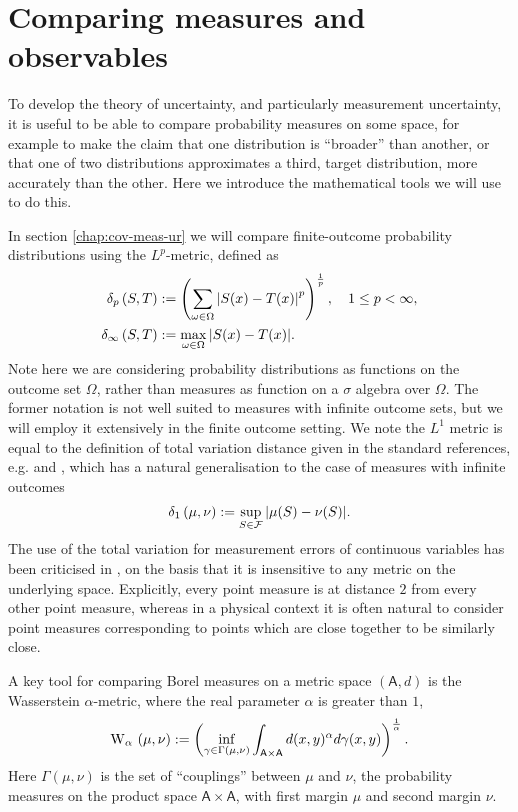 \section{Comparing measures and observables}
\label{sec:comp-measures-and-dists}
To develop the theory of uncertainty, and particularly measurement uncertainty, it is useful to be able to compare probability measures on some space, for example to make the claim that one distribution is ``broader'' than another, or that one of two distributions approximates a third, target distribution, more accurately than the other. Here we introduce the mathematical tools we will use to do this.

In section \ref{chap:cov-meas-ur} we will compare finite-outcome probability distributions using the $L^p$-metric, defined as
\begin{align}
  \label{eqn:lpvar-defn}
  \lPVar{S}{T}[p]&\defeq \left(\sum_{\omega\in\Omega} \abs{S(x) - T(x)}^p\right)^\frac{1}{p}, \quad 1\leq p < \infty,\\
  \lPVar{S}{T}[\infty] &\defeq \max_{\omega\in\Omega} \abs{S(x) - T(x)}.
\end{align}
Note here we are considering probability distributions as functions on the outcome set $\Omega$, rather than measures as function on a $\sigma$ algebra over $\Omega$. The former notation is not well suited to measures with infinite outcome sets, but we will employ it extensively in the finite outcome setting. We note the $L^1$ metric is equal to the definition of total variation distance given in the standard references, e.g. \cite{optimal-transport-villani} and \cite{topics-optimal-transport}, which has a natural generalisation to the case of measures with infinite outcomes
\begin{align}
  \lPVar{\mu}{\nu}[1] \defeq \sup_{S\in\fcal}\abs{\mu(S) - \nu(S)}.
\end{align}
The use of the total variation for measurement errors of continuous variables has been criticised in \cite{blw-meas-uncertainty}, on the basis that it is insensitive to any metric on the underlying space. Explicitly, every point measure is at distance $2$ from every other point measure, whereas in a physical context it is often natural to consider point measures corresponding to points which are close together to be similarly close.

A key tool for comparing Borel measures on a metric space $(\mathsf{A}, d)$ is the Wasserstein $\alpha$-metric, where the real parameter $\alpha$ is greater than $1$,
\begin{align}
  \ws{\mu,\nu}[\alpha]  \defeq \left(\inf_{\gamma\in\Gamma(\mu,\nu)} \int_{\mathsf{A}\times\mathsf{A}} d(x,y)^\alpha d\gamma(x,y)\right)^\frac{1}{\alpha}.\label{eq:wasserstein-prob-dists}
\end{align}
Here $\Gamma(\mu,\nu)$ is the set of ``couplings'' between $\mu$ and $\nu$, the probability measures on the product space $\mathsf{A}\times\mathsf{A}$, with first margin $\mu$ and second margin $\nu$.


